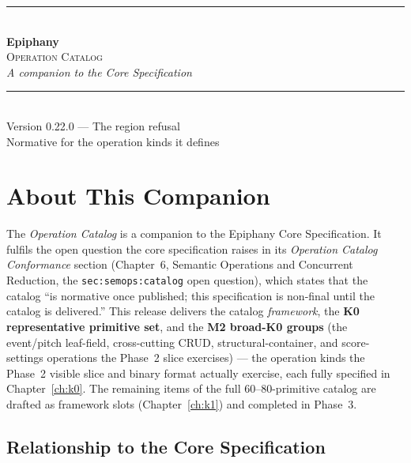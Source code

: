 \documentclass[11pt,letterpaper]{report}
\newcommand{\sectionsc}[1]{{\addfontfeatures{Letters=SmallCaps}#1}}
\begin{document}
\begin{titlepage}
  \thispagestyle{empty}
  \centering
  \vspace*{2.2in}
  {\color{epiphanygold}\rule{3in}{0.8pt}}\\[18pt]
  {\titlefont\fontsize{34pt}{38pt}\selectfont\color{epiphanyteal}\bfseries Epiphany}\\[10pt]
  {\Large\scshape\color{epiphanyslate}Operation Catalog}\\[6pt]
  {\large\itshape\color{epiphanyslate}A companion to the Core Specification}\\[14pt]
  {\color{epiphanygold}\rule{3in}{0.8pt}}\\[24pt]
  {\normalsize\color{epiphanyink}Version 0.22.0 --- The region refusal}\\[4pt]
  {\small\color{epiphanyslate}Normative for the operation kinds it defines}
  \vfill
\end{titlepage}

\tableofcontents

\chapter{About This Companion}
\label{ch:about}

The \emph{Operation Catalog} is a companion to the Epiphany Core Specification.
It fulfils the open question the core specification raises in its
\emph{Operation Catalog Conformance} section (Chapter~6,
\sectionsc{Semantic Operations and Concurrent Reduction}, the
\texttt{sec:semops:catalog} open question), which states that the catalog
``is normative once published; this specification is non-final until the catalog
is delivered.'' This release delivers the catalog \emph{framework}, the
\textbf{K0 representative primitive set}, and the \textbf{M2 broad-K0 groups}
(the event/pitch leaf-field, cross-cutting CRUD, structural-container, and
score-settings operations the Phase~2 slice exercises) --- the operation kinds
the Phase~2 visible slice and binary format actually exercise, each fully
specified in Chapter~\ref{ch:k0}. The remaining items of the full
$60$--$80$-primitive catalog are drafted as framework slots
(Chapter~\ref{ch:k1}) and completed in Phase~3.

\section{Relationship to the Core Specification}
\end{document}

